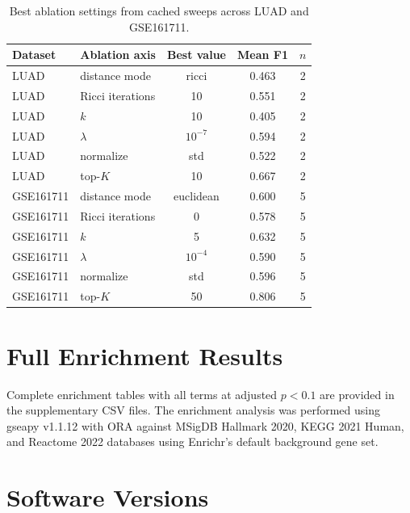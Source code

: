\documentclass[11pt]{article}
\begin{document}
\begin{table}[h]
\centering
\small
\begin{tabular}{llccc}
\toprule
Dataset & Ablation axis & Best value & Mean F1 & $n$ \\
\midrule
LUAD & distance mode & ricci & 0.463 & 2 \\
LUAD & Ricci iterations & 10 & 0.551 & 2 \\
LUAD & $k$ & 10 & 0.405 & 2 \\
LUAD & $\lambda$ & $10^{-7}$ & 0.594 & 2 \\
LUAD & normalize & std & 0.522 & 2 \\
LUAD & top-$K$ & 10 & 0.667 & 2 \\
\midrule
GSE161711 & distance mode & euclidean & 0.600 & 5 \\
GSE161711 & Ricci iterations & 0 & 0.578 & 5 \\
GSE161711 & $k$ & 5 & 0.632 & 5 \\
GSE161711 & $\lambda$ & $10^{-4}$ & 0.590 & 5 \\
GSE161711 & normalize & std & 0.596 & 5 \\
GSE161711 & top-$K$ & 50 & 0.806 & 5 \\
\bottomrule
\end{tabular}
\caption{Best ablation settings from cached sweeps across LUAD and GSE161711.}
\label{tab:supp_ablation}
\end{table}

\section{Full Enrichment Results}
\label{sec:supp_enrichment}

Complete enrichment tables with all terms at adjusted $p < 0.1$ are provided in the supplementary CSV files.
The enrichment analysis was performed using gseapy v1.1.12 with ORA against MSigDB Hallmark 2020, KEGG 2021 Human, and Reactome 2022 databases using Enrichr's default background gene set.

\section{Software Versions}
\label{sec:supp_software}
\end{document}
